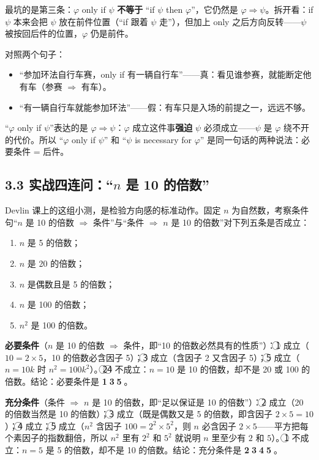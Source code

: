 \documentclass[UTF8,a4paper,11pt]{ctexart}
\begin{document}
最坑的是第三条：$\varphi$ only if $\psi$ \textbf{不等于} “if $\psi$ then $\varphi$”，它仍然是 $\varphi \Rightarrow \psi$。拆开看：if $\psi$ 本来会把 $\psi$ 放在前件位置（“if 跟着 $\psi$ 走”），但加上 only 之后方向反转——$\psi$ 被按回后件的位置，$\varphi$ 仍是前件。

\begin{calcbox}
对照两个句子：
\begin{itemize}
  \item “参加环法自行车赛，only if 有一辆自行车”——真：看见谁参赛，就能断定他有车（参赛 $\Rightarrow$ 有车）。
  \item “有一辆自行车就能参加环法”——假：有车只是入场的前提之一，远远不够。
\end{itemize}
“$\varphi$ only if $\psi$”表达的是 $\varphi \Rightarrow \psi$：$\varphi$ 成立这件事\textbf{强迫} $\psi$ 必须成立——$\psi$ 是 $\varphi$ 绕不开的代价。所以 “$\varphi$ only if $\psi$” 和 “$\psi$ is necessary for $\varphi$” 是同一句话的两种说法：必要条件 = 后件。
\end{calcbox}

\subsection*{3.3 实战四连问：“$n$ 是 10 的倍数”}

Devlin 课上的这组小测，是检验方向感的标准动作。固定 $n$ 为自然数，考察条件句“$n$ 是 10 的倍数 $\Rightarrow$ 条件”与“条件 $\Rightarrow$ $n$ 是 10 的倍数”对下列五条是否成立：

\begin{enumerate}[label=\textcircled{\arabic*}]
  \item $n$ 是 5 的倍数；
  \item $n$ 是 20 的倍数；
  \item $n$ 是偶数且是 5 的倍数；
  \item $n$ 是 100 的倍数；
  \item $n^2$ 是 100 的倍数。
\end{enumerate}

\textbf{必要条件}（$n$ 是 10 的倍数 $\Rightarrow$ 条件，即“10 的倍数必然具有的性质”）：\textcircled{1} 成立（$10 = 2 \times 5$，10 的倍数必含因子 5）；\textcircled{3} 成立（含因子 2 又含因子 5）；\textcircled{5} 成立（$n = 10k$ 时 $n^2 = 100k^2$）。\textcircled{2}\textcircled{4} 不成立：$n = 10$ 是 10 的倍数，却不是 20 或 100 的倍数。结论：必要条件是 \textbf{\textcircled{1}\textcircled{3}\textcircled{5}}。

\textbf{充分条件}（条件 $\Rightarrow$ $n$ 是 10 的倍数，即“足以保证是 10 的倍数”）：\textcircled{2} 成立（20 的倍数当然是 10 的倍数）；\textcircled{3} 成立（既是偶数又是 5 的倍数，即含因子 $2 \times 5 = 10$）；\textcircled{4} 成立；\textcircled{5} 成立（$n^2$ 含因子 $100 = 2^2 \times 5^2$，则 $n$ 必含因子 $2 \times 5$——平方把每个素因子的指数翻倍，所以 $n^2$ 里有 $2^2$ 和 $5^2$ 就说明 $n$ 里至少有 $2$ 和 $5$）。\textcircled{1} 不成立：$n = 5$ 是 5 的倍数，却不是 10 的倍数。结论：充分条件是 \textbf{\textcircled{2}\textcircled{3}\textcircled{4}\textcircled{5}}。
\end{document}
